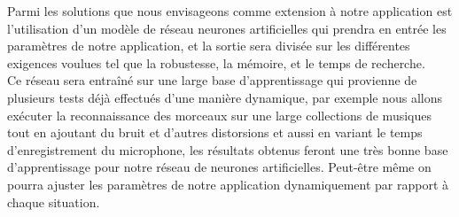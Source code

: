 \documentclass[10pt, report, english]{report}
\begin{document}
Parmi les solutions que nous envisageons comme extension à notre application est l'utilisation d'un modèle de réseau neurones artificielles qui prendra en entrée les paramètres de notre application, et la sortie sera divisée sur les différentes exigences voulues tel que la robustesse, la mémoire, et le temps de recherche.\\

Ce réseau sera entraîné sur une large base d'apprentissage qui provienne de plusieurs tests déjà effectués d'une manière dynamique, par exemple nous allons exécuter la reconnaissance des morceaux sur une large collections de musiques tout en ajoutant du bruit et d'autres distorsions et aussi en variant le temps d'enregistrement du microphone, les résultats obtenus feront une très bonne base d'apprentissage pour notre réseau de neurones artificielles. Peut-être même on pourra ajuster les paramètres de notre application dynamiquement par rapport à chaque situation.\\
\end{document}
